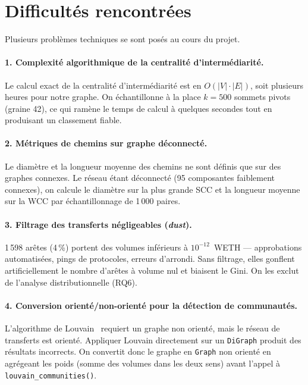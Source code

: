 
\section{Difficult\'es rencontr\'ees}
\label{sec:difficultes}

Plusieurs probl\`emes techniques se sont pos\'es au cours du projet.

\paragraph{1. Complexit\'e algorithmique de la centralit\'e
d'interm\'ediarit\'e.}
Le calcul exact de la centralit\'e d'interm\'ediarit\'e est en
$O(|V| \cdot |E|)$, soit plusieurs heures pour notre graphe. On \'echantillonne
\`a la place $k = 500$ sommets pivots~\cite{freeman1977centrality} (graine 42),
ce qui ram\`ene le temps de calcul \`a quelques secondes tout en produisant un
classement fiable.

\paragraph{2. M\'etriques de chemins sur graphe d\'econnect\'e.}
Le diam\`etre et la longueur moyenne des chemins ne sont d\'efinis que sur
des graphes connexes. Le r\'eseau \'etant d\'econnect\'e (95 composantes
faiblement connexes), on calcule le diam\`etre sur la plus grande SCC et la
longueur moyenne sur la WCC par \'echantillonnage de 1\,000 paires.

\paragraph{3. Filtrage des transferts n\'egligeables (\textit{dust}).}
1\,598 ar\^etes (4\,\%) portent des volumes inf\'erieurs \`a $10^{-12}$~WETH
--- approbations automatis\'ees, pings de protocoles, erreurs d'arrondi. Sans
filtrage, elles gonflent artificiellement le nombre d'ar\^etes \`a volume nul
et biaisent le Gini. On les exclut de l'analyse distributionnelle (RQ6).

\paragraph{4. Conversion orient\'e/non-orient\'e pour la d\'etection de
communaut\'es.}
L'algorithme de Louvain~\cite{blondel2008louvain} requiert un graphe non
orient\'e, mais le r\'eseau de transferts est orient\'e. Appliquer Louvain
directement sur un \texttt{DiGraph} produit des r\'esultats incorrects. On
convertit donc le graphe en \texttt{Graph} non orient\'e en agr\'egeant les
poids (somme des volumes dans les deux sens) avant l'appel \`a
\texttt{louvain\_communities()}.

